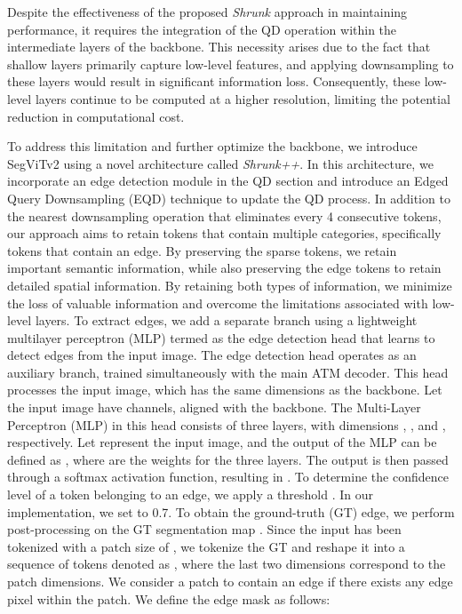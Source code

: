 Despite the effectiveness of the proposed \emph{Shrunk} approach in maintaining performance, it requires the integration of the QD operation within the intermediate layers of the backbone. This necessity arises due to the fact that shallow layers primarily capture low-level features, and applying downsampling to these layers would result in significant information loss. Consequently, these low-level layers continue to be computed at a higher resolution, limiting the potential reduction in computational cost.

To address this limitation and further optimize the backbone, we introduce SegViTv2 using a novel architecture called \emph{Shrunk++}. In this architecture, we incorporate an edge detection module in the QD section and introduce an Edged Query Downsampling (EQD) technique to update the QD process. In addition to the  nearest downsampling operation that eliminates every 4 consecutive tokens, our approach aims to retain tokens that contain multiple categories, specifically tokens that contain an edge. By preserving the  sparse tokens, we retain important semantic information, while also preserving the edge tokens to retain detailed spatial information. By retaining both types of information, we minimize the loss of valuable information and overcome the limitations associated with low-level layers.
To extract edges, we add a separate branch using a lightweight multilayer perceptron (MLP) termed as the edge detection head that learns to detect edges from the input image. 
The edge detection head operates as an auxiliary branch, trained simultaneously with the main ATM decoder. This head processes the input image, which has the same dimensions as the backbone. Let the input image have  channels, aligned with the backbone. The Multi-Layer Perceptron (MLP) in this head consists of three layers, with dimensions , , and , respectively. Let  represent the input image, and the output of the MLP can be defined as , where  are the weights for the three layers. The output  is then passed through a softmax activation function, resulting in . To determine the confidence level of a token belonging to an edge, we apply a threshold . In our implementation, we set  to 0.7.
To obtain the ground-truth (GT) edge, we perform post-processing on the GT segmentation map . Since the input has been tokenized with a patch size of , we tokenize the GT and reshape it into a sequence of tokens denoted as , where the last two dimensions correspond to the patch dimensions. We consider a patch to contain an edge if there exists any edge pixel within the patch. We define the edge mask  as follows:





